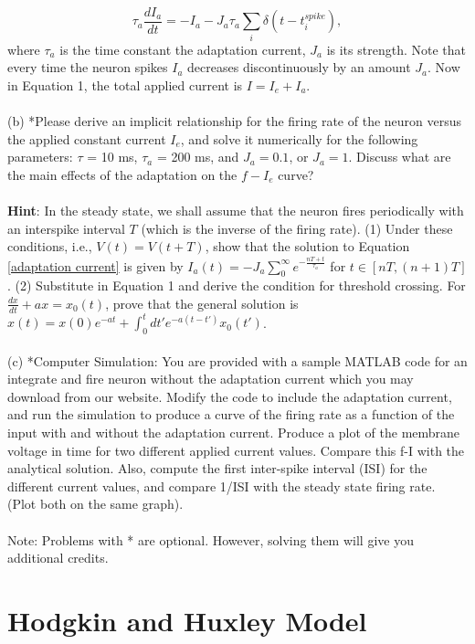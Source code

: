 \documentclass{article}
\begin{document}
\begin{equation}
\label{adaptation current}
\tau_a \frac{dI_a}{dt}=-I_a - J_a\tau_a\sum_i\delta(t-t^{spike}_{i}), 
\end{equation}
where $\tau_a$ is the time constant the adaptation current, $J_a$ is its strength. Note that every time the neuron spikes $I_a$ decreases discontinuously by an amount $J_a$. Now in Equation 1,  the total applied current is $I=I_e+I_a$.
\\
\\
(b) *Please derive an implicit relationship for the firing rate of the neuron versus the applied constant current $I_e$, and solve it numerically for the following parameters: $\tau$ = 10 ms, $\tau_a$ = 200 ms, and $J_a =0.1$, or $J_a = 1$. Discuss what are the main effects of the adaptation on the $f-I_e$ curve?
\\
\\
\textbf{Hint}: In the steady state, we shall assume that the neuron fires periodically with an interspike interval $T$ (which is the inverse of the firing rate). (1) Under these conditions, i.e., $V(t)=V(t+T)$, show that the solution to Equation \ref{adaptation current} is given by $I_a(t)=-J_a\sum_0^{\infty} e^{-\frac{nT+t}{\tau_a}}$ for $t \in [nT, (n+1)T]$. (2) Substitute in Equation 1 and derive the condition for threshold crossing. For $\frac{dx}{dt}+ax=x_0(t)$, prove that the general solution is $x(t)=x(0)e^{-at}+\int_{0}^{t}dt'e^{-a(t-t')}x_0(t')$. 
\\
\\
(c) *Computer Simulation: You are provided with a sample MATLAB code for an integrate and fire neuron without the adaptation current which you may download from our website. Modify the code to include the adaptation current, and run the simulation to produce a curve of the firing rate as a function of the input with and without the adaptation current. Produce a plot of the membrane voltage in time for two different applied current values. Compare this f-I with the analytical solution. Also, compute the first inter-spike interval (ISI) for the different current values, and compare 1/ISI with the steady state firing rate. (Plot both on the same graph).
\\
\\
Note: Problems with * are optional. However, solving them will give you additional credits.


\section*{Hodgkin and Huxley Model}
\end{document}
